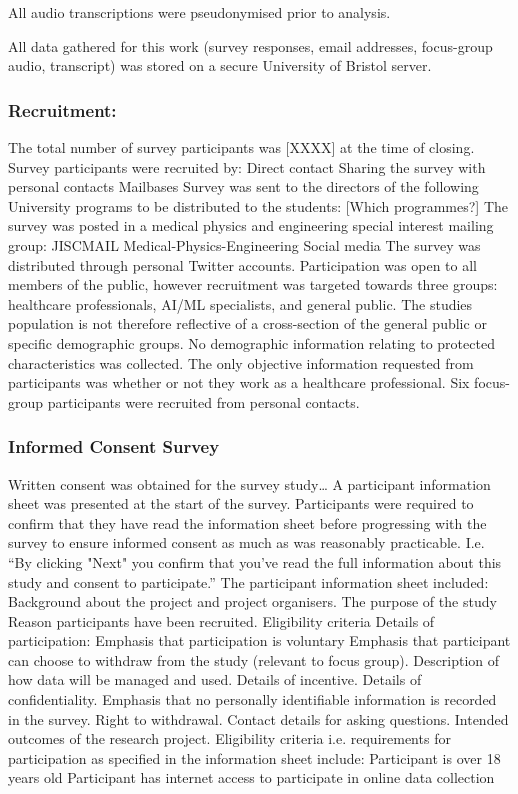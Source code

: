 \documentclass[manuscript,screen,review]{acmart}
\begin{document}
All audio transcriptions were pseudonymised prior to analysis.

All data gathered for this work (survey responses, email addresses, focus-group audio, transcript) was stored on a secure University of Bristol server. 

\subsubsection{Recruitment:}  


The total number of survey participants was [XXXX] at the time of closing.
Survey participants were recruited by:
Direct contact
Sharing the survey with personal contacts
Mailbases 
Survey was sent to the directors of the following University programs to be  distributed to the students:
[Which programmes?]
The survey was posted in a medical physics and engineering special interest mailing group: JISCMAIL Medical-Physics-Engineering 
Social media
The survey was distributed through personal Twitter accounts.
Participation was open to all members of the public, however recruitment was targeted towards three groups: healthcare professionals, AI/ML specialists, and general public. The studies population is not therefore reflective of a cross-section of the general public or specific demographic groups. 
No demographic information relating to protected characteristics was collected. 
The only objective information requested from participants was whether or not they work as a healthcare professional. 
Six focus-group participants were recruited from personal contacts. 

\subsubsection{Informed Consent Survey}  


Written consent was obtained for the survey study…
A participant information sheet was presented at the start of the survey. Participants were required to confirm that they have read the information sheet before progressing with the survey to ensure informed consent as much as was reasonably practicable. 
I.e. “By clicking "Next" you confirm that you've read the full information about this study and consent to participate.”
The participant information sheet included:
Background about the project and project organisers.
The purpose of the study
Reason participants have been recruited. 
Eligibility criteria
Details of participation:
Emphasis that participation is voluntary
Emphasis that participant can choose to withdraw from the study (relevant to focus group).
Description of how data will be managed and used.
Details of incentive.
Details of confidentiality. 
Emphasis that no personally identifiable information is recorded in the survey. 
Right to withdrawal.
Contact details for asking questions. 
Intended outcomes of the research project.
Eligibility criteria i.e. requirements for participation as specified in the information sheet include:
Participant is over 18 years old
Participant has internet access to participate in online data collection
\end{document}

